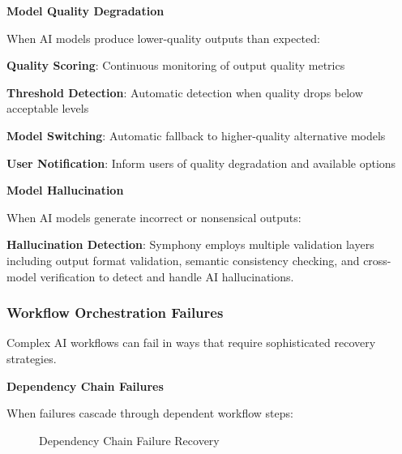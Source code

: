 \textbf{Model Quality Degradation}

When AI models produce lower-quality outputs than expected:

\begin{compactlist}
    \item \textbf{Quality Scoring}: Continuous monitoring of output quality metrics
    \item \textbf{Threshold Detection}: Automatic detection when quality drops below acceptable levels
    \item \textbf{Model Switching}: Automatic fallback to higher-quality alternative models
    \item \textbf{User Notification}: Inform users of quality degradation and available options
\end{compactlist}

\textbf{Model Hallucination}

When AI models generate incorrect or nonsensical outputs:

\begin{alertbox}
\textbf{Hallucination Detection}: Symphony employs multiple validation layers including output format validation, semantic consistency checking, and cross-model verification to detect and handle AI hallucinations.
\end{alertbox}

\subsubsection{Workflow Orchestration Failures}

Complex AI workflows can fail in ways that require sophisticated recovery strategies.

\textbf{Dependency Chain Failures}

When failures cascade through dependent workflow steps:

\begin{figure}[h]
\centering
{}
\caption{Dependency Chain Failure Recovery}
\label{fig:dependency-failure}
\end{figure}

